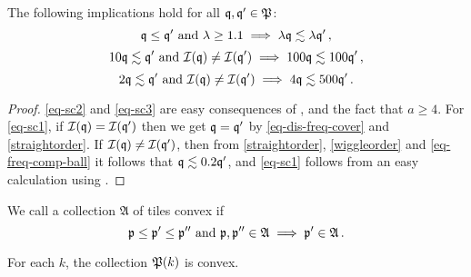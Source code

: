 \begin{lemma}
\label{wiggle-order-3}
\leanok
{}
    The following implications hold for all ${\mathfrak q}, {\mathfrak q}' \in {\mathfrak P}$:
    \begin{equation}
        \label{eq-sc1}
        {\mathfrak q} \le {\mathfrak q}' \ \text{and} \ \lambda \ge 1.1 \implies \lambda {\mathfrak q} \lesssim \lambda {\mathfrak q}'\,,
    \end{equation}
    \begin{equation}
        \label{eq-sc2}
        10{\mathfrak q} \lesssim {\mathfrak q}' \ \text{and} \ {\mathcal{I}}({\mathfrak q}) \ne {\mathcal{I}}({\mathfrak q}') \implies 100 {\mathfrak q} \lesssim 100 {\mathfrak q}'\,,
    \end{equation}
    \begin{equation}
        \label{eq-sc3}
        2{\mathfrak q} \lesssim {\mathfrak q}' \ \text{and} \ {\mathcal{I}}({\mathfrak q}) \ne {\mathcal{I}}({\mathfrak q}') \implies 4 {\mathfrak q} \lesssim 500 {\mathfrak q}'\,.
    \end{equation}
\end{lemma}

\begin{proof}
    \leanok
    \eqref{eq-sc2} and \eqref{eq-sc3} are easy consequences of ,  and the fact that $a \ge 4$.
    For \eqref{eq-sc1}, if ${\mathcal{I}}({\mathfrak q}) = {\mathcal{I}}({\mathfrak q}')$ then
    we get ${\mathfrak q} = {\mathfrak q}'$ by \eqref{eq-dis-freq-cover} and \eqref{straightorder}.
    If ${\mathcal{I}}({\mathfrak q}) \ne {\mathcal{I}}({\mathfrak q}')$, then from \eqref{straightorder},
    \eqref{wiggleorder} and \eqref{eq-freq-comp-ball} it follows that
    ${\mathfrak q} \lesssim 0.2{\mathfrak q}'$, and \eqref{eq-sc1} follows from an easy calculation using
    .
\end{proof}



We call a collection $\mathfrak{A}$ of tiles convex if
\begin{equation}
    \label{eq-convexity}
    {\mathfrak p} \le {\mathfrak p}' \le {\mathfrak p}'' \ \text{and} \ {\mathfrak p}, {\mathfrak p}'' \in \mathfrak{A} \implies {\mathfrak p}' \in \mathfrak{A}\,.
\end{equation}

\begin{lemma}[P convex]
    \label{P-convex}
    \leanok

    For each $k$, the collection ${\mathfrak P}(k)$ is convex.
\end{lemma}


